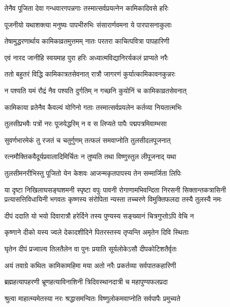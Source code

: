 \twolineshloka
{तेनैव पूजिता देवा गन्धवारगपन्नगाः}
{तस्मात्सर्वप्रयत्नेन कामिकादिवसे हरिः} %

\twolineshloka
{पूजनीयो यथाशक्त्या मनुष्यः पापभीरुभिः}
{संसारार्णवमना ये पारपासनाकुलाः} %

\twolineshloka
{तेषामुद्धरणार्थाय कामिकाव्रतमुत्तमम्}
{नातः परतरा काचित्पवित्रा पापहारिणी} %

\twolineshloka
{एवं नारद जानीहि स्वयमाह पुरा हरिः}
{अध्यात्मविद्यानिरर्यकलं प्राप्यते नरैः} %

\twolineshloka
{ततो बहुतरं विद्धि कामिकात्रतसेवनात्}
{रात्रौ जागरणं कुर्यात्कामिकावनकुन्नरः} %

\twolineshloka
{न पश्यति यमं रौद्रं नैव पश्यति दुर्गतिम्}
{न गच्छनि कुयोनिं च कामिकाव्रतसेवनात्} %

\twolineshloka
{कामिकाया व्रतेनैव कैवल्यं योगिनो गताः}
{तस्मात्सर्वप्रयलेन कर्तव्या नियतात्मभिः} %

\twolineshloka
{तुलसीप्रभवैः पत्रों नरः पूजयेद्धरिम्}
{न व स लिप्यते पापैः पद्मपत्रमिवाम्भसा} %

\twolineshloka
{सुवर्णभारमेकं तु रजतं च चतुर्गुणम्}
{तत्फलं समवाप्नोति तुलसीदलपूजनात्} %

\twolineshloka
{रत्नमौक्तिकवैदूर्यप्रवालादिमिर्चितः}
{न तुष्यति तथा विष्णुस्तुल लीपूजनाद् यथा} %

\twolineshloka
{तुलसीमनरीभिस्तु पूजितो येन केशवः}
{आजन्मकृतपापस्य तेन सम्मार्जिता लिपिः} %

\fourlineindentedshloka
{या दृष्टा निखिलाघसङ्घशमनी स्पृष्टा वपुः पावनी}
{रोगाणामभिवन्दिता निरसनी सिक्तान्तकत्रासिनी}
{प्रत्यासत्तिविधायिनी भगवतः कृष्णस्य संरोपिता}
{न्यस्ता तच्चरणे विमुक्तिफलदा तस्यै तुलस्यै नमः} %

\twolineshloka
{दीपं ददाति यो भयो दिवारात्रौ हरेर्दिने}
{तस्य पुण्यस्य सङ्ख्यानं चित्रगुप्तोऽपि वेचि न} %

\twolineshloka
{कृष्णाने दीको यस्य ज्वले देकादशीदिने}
{पितरस्तस्य तृप्यन्ति अमृतेन दिवि स्थिताः} %

\twolineshloka
{घृतेन दीपं प्रज्वाल्य तिलतैलेन वा पुनः}
{प्रयाति सूर्यलोकेऽसौ दीपकोटिशतैर्वृतः} %

\twolineshloka
{अयं तवाग्रे कथितः कामिकामहिमा मया}
{अतो नरैः प्रकर्तव्या सर्वपातकहारिणी} %

\twolineshloka
{ब्रह्महत्यापहरणी भ्रूणहत्याविनाशिनी}
{त्रिदिवस्थानदात्री च महापुण्यफलप्रदा} %

\twolineshloka
{श्रुत्वा माहात्म्यमेतस्या नरः श्रद्धासमन्वितः}
{विष्णुलोकमवाप्नोति सर्वपापैः प्रमुच्यते} %

